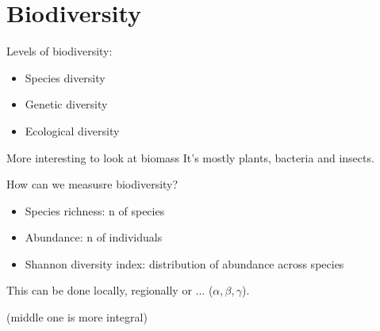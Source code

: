 % 
\chapter{Biodiversity}

Levels of biodiversity:
\begin{itemize}
\item Species diversity
\item Genetic diversity
\item Ecological diversity
\end{itemize}

More interesting to look at biomass
It's mostly plants, bacteria and insects.

How can we measusre biodiversity?
\begin{itemize}
\item Species richness: n of species
\item Abundance: n of individuals
\item Shannon diversity index: distribution of abundance across species
\end{itemize}
This can be done locally, regionally or ... ($ \alpha, \beta, \gamma $).

(middle one is more integral) 
% 


